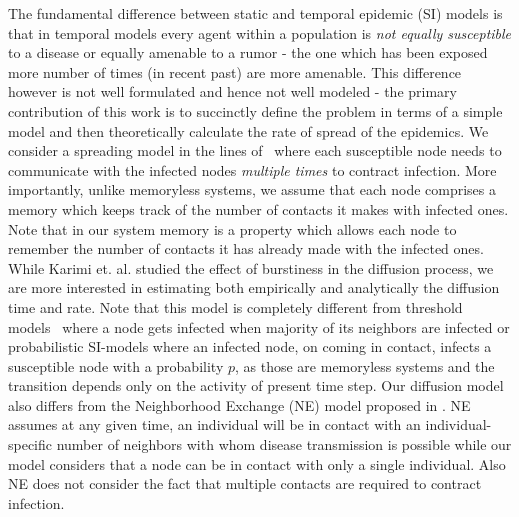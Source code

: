 The fundamental difference between static and temporal epidemic (SI) models is that in temporal models every agent  within a population is {\em not equally susceptible} to a disease or equally amenable to a rumor
 - the one which has been exposed more number of times (in recent past) are more amenable. This difference however is not well formulated and hence not well modeled - the primary contribution of this work 
is to succinctly define the problem in  terms of a simple model and then theoretically calculate the rate of spread of the epidemics. 
We consider a spreading model in the lines of~\cite{takaguchi2013bursty} where each susceptible node needs to communicate with the 
infected nodes {\em multiple times} to contract infection. More importantly, unlike memoryless systems, we assume that each node comprises a memory which 
keeps track of the number of contacts it makes with infected ones. Note that in our system memory is a property which allows each node to remember the number 
of contacts it has already made with the infected ones. While Karimi et. al. studied the effect of burstiness in the diffusion process, we 
are more interested in estimating both empirically and analytically the diffusion time and rate.
Note that this model is completely different from  threshold models~\cite{granovetter1978threshold,sur1} where a node
 gets infected when majority of its neighbors are infected or probabilistic SI-models where an infected node,  on coming in contact, 
infects a susceptible node with a probability $p$,  as those are memoryless systems and the transition depends only on the activity of present time step. 
Our diffusion model also differs from the Neighborhood Exchange (NE) model proposed in \cite{volz2007susceptible}. NE assumes at any given time, an individual
will be in contact with an individual-specific number of neighbors with whom disease transmission is possible while our model considers that a node can be in contact with 
only a single individual. Also NE does not consider the fact that multiple contacts are required to contract infection.

